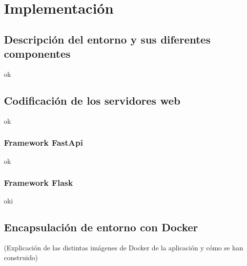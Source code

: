 \cleardoublepage
\mbox{}

\chapter{Implementación}
\label{ch:chapter4}

\section{Descripción del entorno y sus diferentes componentes}
ok
\section{Codificación de los servidores web}
ok
\subsection{Framework FastApi}
ok
\subsection{Framework Flask}
oki
\section{Encapsulación de entorno con Docker}
(Explicación de las distintas imágenes de Docker de la aplicación y cómo se han construido)
